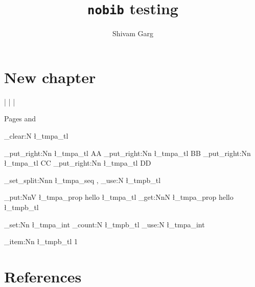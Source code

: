 \documentclass[letter, 11pt]{article}
\title{\texttt{nobib} testing}
\author{Shivam Garg}
\date{}
\begin{document}
\maketitle



\section{New chapter}

\cite{bubeck2019} |
\cite*{bubeck2019} |
\cite[a]{bubeck2019} |
\cite[y]{bubeck2019}
\newpage
\cite{bubeck2019}
\cite*{vanroy2024}

\newpage 
Pages \pageref{bubeck2019-1} and \pageref{bubeck2019-2}  \pageref{vanroy2024-1}

\ExplSyntaxOn


\tl_clear:N \l_tmpa_tl

\tl_put_right:Nn \l_tmpa_tl {{AA}}
\tl_put_right:Nn \l_tmpa_tl {{BB}}
\tl_put_right:Nn \l_tmpa_tl {{CC}}
\tl_put_right:Nn \l_tmpa_tl {{DD}}


\seq_set_split:Nnn \l_tmpa_seq { , } {\tl_use:N \l_tmpb_tl}

\prop_put:NnV \l_tmpa_prop {hello} {\l_tmpa_tl}
\prop_get:NnN \l_tmpa_prop {hello} {\l_tmpb_tl}

\int_set:Nn \l_tmpa_int {\tl_count:N \l_tmpb_tl}
\int_use:N \l_tmpa_int
\par

\tl_item:Nn \l_tmpb_tl {1}
\par\par
\ExplSyntaxOff


\section*{References}

\nobibCreateBibliography
\end{document}
